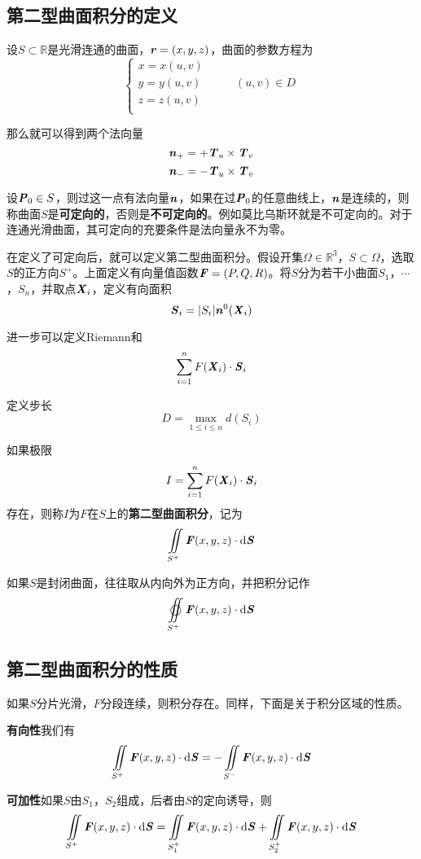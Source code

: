 \documentclass[UTF8,openany]{book}
\begin{document}
	\subsection{第二型曲面积分的定义}
	\par 设$S\subset\mathbb{R}$是光滑连通的曲面，$\textbf{\textit{r}}=(x,y,z)$，曲面的参数方程为
	$$\begin{cases}
	x=x(u,v)\\
	y=y(u,v) & \qquad (u,v)\in D\\
	z=z(u,v)\\
	\end{cases}$$
	\par 那么就可以得到两个法向量
	$$\textbf{\textit{n}}_{+}=+\textbf{\textit{T}}_u\times\textbf{\textit{T}}_v$$
	$$\textbf{\textit{n}}_{-}=-\textbf{\textit{T}}_u\times\textbf{\textit{T}}_v$$
	\par 设$\textbf{\textit{P}}_0\in S$，则过这一点有法向量$\textbf{\textit{n}}$，如果在过$\textbf{\textit{P}}_0$的任意曲线上，$\textbf{\textit{n}}$是连续的，则称曲面$S$是\textbf{可定向的}，否则是\textbf{不可定向的}。例如莫比乌斯环就是不可定向的。对于连通光滑曲面，其可定向的充要条件是法向量永不为零。
	\par 在定义了可定向后，就可以定义第二型曲面积分。假设开集$\Omega\in\mathbb{R}^3$，$S\subset\Omega$，选取$S$的正方向$S^+$。上面定义有向量值函数$\textbf{\textit{F}}=(P,Q,R)$。将$S$分为若干小曲面$S_1$，$\cdots$，$S_n$，并取点$\textbf{\textit{X}}_i$，定义有向面积
	$$\textbf{\textit{S}}_i=|S_i|\textbf{\textit{n}}^0(\textbf{\textit{X}}_i)$$
	\par 进一步可以定义Riemann和
	$$\sum_{i=1}^{n}F(\textbf{\textit{X}}_i)\cdot\textbf{\textit{S}}_i$$
	\par 定义步长
	$$D=\max_{1\leqslant i\leqslant n}d(S_i)$$
	\par 如果极限
	$$I=\sum_{i=1}^{n}F(\textbf{\textit{X}}_i)\cdot\textbf{\textit{S}}_i$$
	存在，则称$I$为$F$在$S$上的\textbf{第二型曲面积分}，记为
	$$\iint\limits_{S^+}\textbf{\textit{F}}(x,y,z)\cdot\mathrm{d}\textbf{\textit{S}}$$
	\par 如果$S$是封闭曲面，往往取从内向外为正方向，并把积分记作
	$$\varoiint\limits_{S^+}\textbf{\textit{F}}(x,y,z)\cdot\mathrm{d}\textbf{\textit{S}}$$
	\subsection{第二型曲面积分的性质}
	\par 如果$S$分片光滑，$F$分段连续，则积分存在。同样，下面是关于积分区域的性质。
	\par \textbf{有向性}\quad 我们有
	$$\iint\limits_{S^+}\textbf{\textit{F}}(x,y,z)\cdot\mathrm{d}\textbf{\textit{S}}=
	-\iint\limits_{S^-}\textbf{\textit{F}}(x,y,z)\cdot\mathrm{d}\textbf{\textit{S}}$$
	\par \textbf{可加性}\quad 如果$S$由$S_1$，$S_2$组成，后者由$S$的定向诱导，则
	$$\iint\limits_{S^+}\textbf{\textit{F}}(x,y,z)\cdot\mathrm{d}\textbf{\textit{S}}=
	\iint\limits_{S^+_1}\textbf{\textit{F}}(x,y,z)\cdot\mathrm{d}\textbf{\textit{S}}+
	\iint\limits_{S^+_2}\textbf{\textit{F}}(x,y,z)\cdot\mathrm{d}\textbf{\textit{S}}$$
\end{document}
